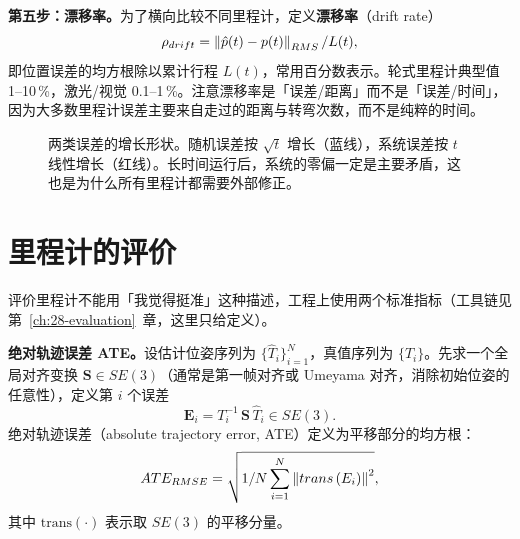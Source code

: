 \textbf{第五步：漂移率。}为了横向比较不同里程计，定义\textbf{漂移率}（drift rate）
\begin{equation}
  \rho_{drift} = \left\lVert \hat{p}(t)-p(t) \right\rVert_{RMS}/L(t),
  \label{eq:04-drift-rate}
\end{equation}
即位置误差的均方根除以累计行程 $L(t)$，常用百分数表示。轮式里程计典型值 1--10\,\%，激光/视觉 0.1--1\,\%。注意漂移率是「误差/距离」而不是「误差/时间」，因为大多数里程计误差主要来自走过的距离与转弯次数，而不是纯粹的时间。

\begin{figure}[htbp]
  \centering
  \caption{两类误差的增长形状。随机误差按 $\sqrt{t}$ 增长（蓝线），系统误差按 $t$ 线性增长（红线）。长时间运行后，系统的零偏一定是主要矛盾，这也是为什么所有里程计都需要外部修正。}
  \label{fig:04-drift}
\end{figure}

\section{里程计的评价}\label{sec:04-eval}

评价里程计不能用「我觉得挺准」这种描述，工程上使用两个标准指标（工具链见第~\ref{ch:28-evaluation}~章，这里只给定义）。

\textbf{绝对轨迹误差 ATE。}设估计位姿序列为 $\{\hat{T}_i\}_{i=1}^{N}$，真值序列为 $\{T_i\}$。先求一个全局对齐变换 $\bm{S}\in SE(3)$（通常是第一帧对齐或 Umeyama 对齐，消除初始位姿的任意性），定义第 $i$ 个误差
\begin{equation}
  \bm{E}_i = T_i^{-1}\,\bm{S}\,\hat{T}_i \in SE(3).
  \label{eq:04-ate-error}
\end{equation}
绝对轨迹误差（absolute trajectory error, ATE）定义为平移部分的均方根：
\begin{equation}
  ATE_{RMSE} = \sqrt{1/N\sum_{i=1}^{N}\left\lVert trans\left(E_i\right) \right\rVert^{2}},
  \label{eq:04-ate}
\end{equation}
其中 $\mathrm{trans}(\cdot)$ 表示取 $SE(3)$ 的平移分量。

